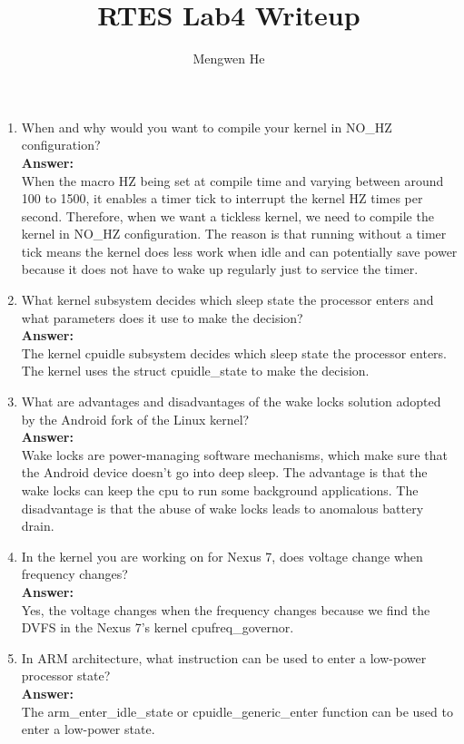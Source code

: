 \documentclass[letterpaper,12pt]{article}
\title{\textbf{RTES Lab4 Writeup}}
\author{Mengwen He}
\begin{document}
\maketitle

\begin{enumerate}
	\item When and why would you want to compile your kernel in NO\_HZ configuration?\\
	\textbf{Answer:}\\
	When the macro HZ being set at compile time and varying between around 100 to 1500, it enables a timer tick to interrupt the kernel HZ times per second. Therefore, when we want a tickless kernel, we need to compile the kernel in NO\_HZ configuration. The reason is that running without a timer tick means the kernel does less work when idle and can potentially save power because it does not have to wake up regularly just to service the timer.
	
	\item What kernel subsystem decides which sleep state the processor enters and what parameters does it use to make the decision?\\
	\textbf{Answer:}\\
	The kernel cpuidle subsystem decides which sleep state the processor enters. The kernel uses the struct cpuidle\_state to make the decision.
	
	\item What are advantages and disadvantages of the wake locks solution adopted by the Android fork of the Linux kernel?\\
	\textbf{Answer:}\\
	Wake locks are power-managing software mechanisms, which make sure that the Android device doesn't go into deep sleep. The advantage is that the wake locks can keep the cpu to run some background applications. The disadvantage is that the abuse of wake locks leads to anomalous battery drain.
	
	\item In the kernel you are working on for Nexus 7, does voltage change when frequency changes?\\
	\textbf{Answer:}\\
	Yes, the voltage changes when the frequency changes because we find the DVFS in the Nexus 7's kernel cpufreq\_governor.
	
	\item In ARM architecture, what instruction can be used to enter a low-power processor state?\\
	\textbf{Answer:}\\
	The arm\_enter\_idle\_state or cpuidle\_generic\_enter function can be used to enter a low-power state.
		
\end{enumerate}
\end{document}
